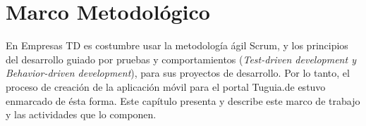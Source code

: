 \chapter{Marco Metodológico} \label{chap:marco_metodologico}

\vspace{5 mm}

En Empresas TD es costumbre usar la metodología ágil Scrum, y los principios del desarrollo guiado por pruebas y comportamientos (\textit{Test-driven development y Behavior-driven development}), para sus proyectos de desarrollo. Por lo tanto, el proceso de creación de la aplicación móvil para el portal Tuguia.de estuvo enmarcado de ésta forma. Este capítulo presenta y describe este marco de trabajo y las actividades que lo componen.
